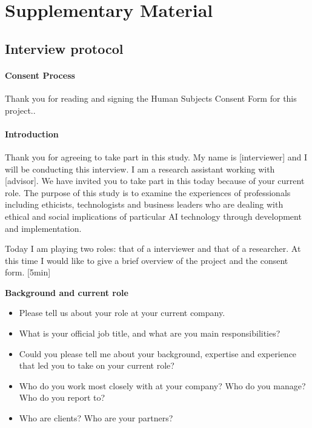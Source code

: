 \newpage
\onecolumn
\section{Supplementary Material}
\label{sec:supplementary}
\subsection{Interview protocol}





    
\paragraph{Consent Process    
}Thank you for reading and signing the Human Subjects Consent Form for this project..

    
\paragraph{Introduction}  
Thank you for agreeing to take part in this study. My name is [interviewer] and I will be conducting this interview. I am a research assistant working with [advisor].
We have invited you to take part in this today because of your current role. The purpose of this study is to examine the experiences of professionals including ethicists, technologists and business leaders who are dealing with ethical and social implications of particular AI technology through development and implementation. 

Today I am playing two roles: that of a interviewer and that of a researcher. 
At this time I would like to give a brief overview of the project and the consent form. [5min] 

\textbf{Background and current role 
}
\begin{itemize}
    \item Please tell us about your role at your current company. 
\item What is your official job title, and what are you main responsibilities? 
\item Could you please tell me about your background, expertise and experience that led you to take on your current role? 
\item Who do you work most closely with at your company? Who do you manage?  Who do you report to? \item Who are clients? Who are your partners? 
\end{itemize}

